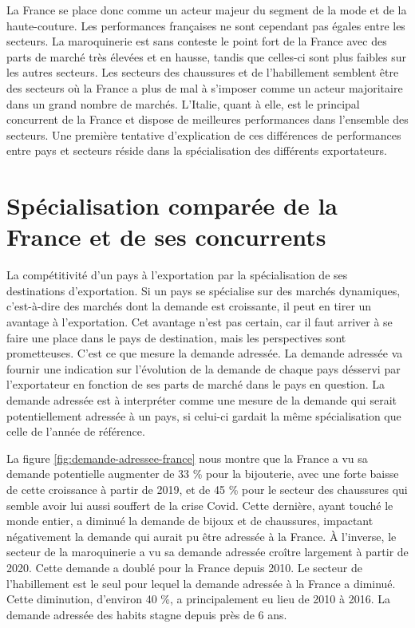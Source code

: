 \documentclass[french,10pt,a4paper]{article}
\begin{document}
La France se place donc comme un acteur majeur du segment de la mode et de la haute-couture. Les performances françaises ne sont cependant pas égales entre les secteurs. La maroquinerie est sans conteste le point fort de la France avec des parts de marché très élevées et en hausse, tandis que celles-ci sont plus faibles sur les autres secteurs. Les secteurs des chaussures et de l'habillement semblent être des secteurs où la France a plus de mal à s'imposer comme un acteur majoritaire dans un grand nombre de marchés. L'Italie, quant à elle, est le principal concurrent de la France et dispose de meilleures performances dans l'ensemble des secteurs. Une première tentative d'explication de ces différences de performances entre pays et secteurs réside dans la spécialisation des différents exportateurs.


\section{Spécialisation comparée de la France et de ses concurrents}
La compétitivité d'un pays à l'exportation par la spécialisation de ses destinations d'exportation. Si un pays se spécialise sur des marchés dynamiques, c'est-à-dire des marchés dont la demande est croissante, il peut en tirer un avantage à l'exportation. Cet avantage n'est pas certain, car il faut arriver à se faire une place dans le pays de destination, mais les perspectives sont prometteuses. C'est ce que mesure la demande adressée. La demande adressée va fournir une indication sur l'évolution de la demande de chaque pays désservi par l'exportateur en fonction de ses parts de marché dans le pays en question. La demande adressée est à interpréter comme une mesure de la demande qui serait potentiellement adressée à un pays, si celui-ci gardait la même spécialisation que celle de l'année de référence.

La figure \ref{fig:demande-adressee-france} nous montre que la France a vu sa demande potentielle augmenter de 33 \% pour la bijouterie, avec une forte baisse de cette croissance à partir de 2019, et de 45 \% pour le secteur des chaussures qui semble avoir lui aussi souffert de la crise Covid. Cette dernière, ayant touché le monde entier, a diminué la demande de bijoux et de chaussures, impactant négativement la demande qui aurait pu être adressée à la France. À l'inverse, le secteur de la maroquinerie a vu sa demande adressée croître largement à partir de 2020. Cette demande a doublé pour la France depuis 2010. Le secteur de l'habillement est le seul pour lequel la demande adressée à la France a diminué. Cette diminution, d'environ 40 \%, a principalement eu lieu de 2010 à 2016. La demande adressée des habits stagne depuis près de 6 ans.
\end{document}
